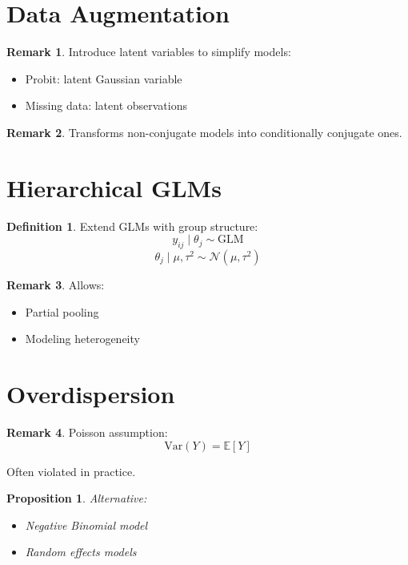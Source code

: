 \documentclass[12pt,oneside]{book}
\numberwithin{equation}{section}
\theoremstyle{definition}
\newtheorem{definition}{Definition}[section]
\newtheorem{remark}{Remark}[section]
\theoremstyle{plain}
\newtheorem{proposition}{Proposition}[section]
\theoremstyle{remark}
\newcommand{\E}{\mathbb{E}}
\newcommand{\Var}{\mathrm{Var}}
\newcommand{\Normal}{\mathcal{N}}
\begin{document}
\section{Data Augmentation}

\begin{remark}
Introduce latent variables to simplify models:
\begin{itemize}
\item Probit: latent Gaussian variable
\item Missing data: latent observations
\end{itemize}
\end{remark}

\begin{remark}
Transforms non-conjugate models into conditionally conjugate ones.
\end{remark}

\section{Hierarchical GLMs}

\begin{definition}
Extend GLMs with group structure:
$$
y_{ij} \mid \theta_j \sim \text{GLM}
$$
$$
\theta_j \mid \mu, \tau^2 \sim \Normal(\mu, \tau^2)
$$
\end{definition}

\begin{remark}
Allows:
\begin{itemize}
\item Partial pooling
\item Modeling heterogeneity
\end{itemize}
\end{remark}

\section{Overdispersion}

\begin{remark}
Poisson assumption:
$$
\Var(Y) = \E[Y]
$$

Often violated in practice.
\end{remark}

\begin{proposition}
Alternative:
\begin{itemize}
\item Negative Binomial model
\item Random effects models
\end{itemize}
\end{proposition}
\end{document}

